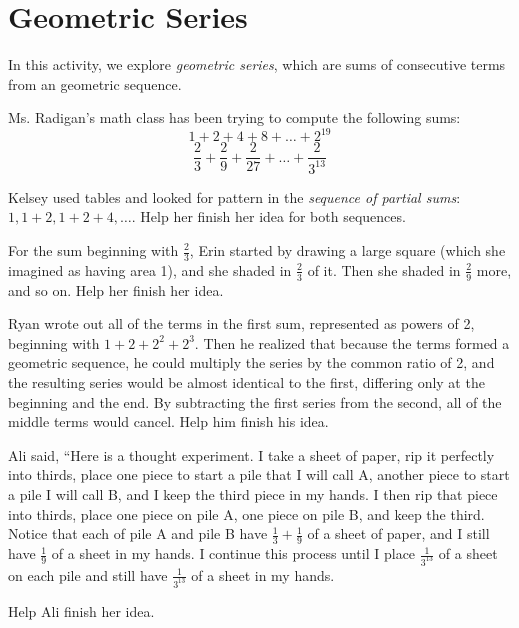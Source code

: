 \newpage
\section{Geometric Series}\label{A:geometicSeries}

In this activity, we explore \emph{geometric series}, which are sums of consecutive terms from an geometric sequence.

Ms. Radigan's math class has been trying to compute the following sums:  
$$1+2+4+8+\dots+2^{19}$$
$$\frac{2}{3}+\frac{2}{9}+\frac{2}{27}+\dots+\frac{2}{3^{13}}$$

\begin{prob}
Kelsey used tables and looked for pattern in the \emph{sequence of partial sums}:  $1, 1+2, 1+2+4, \dots$.  Help her finish her idea for both sequences.    
\end{prob}

\begin{prob}
For the sum beginning with $\frac{2}{3}$, Erin started by drawing a large square (which she imagined as having area 1), and she shaded in $\frac{2}{3}$ of it.  Then she shaded in $\frac{2}{9}$ more, and so on.  Help her finish her idea.  
\end{prob}

\begin{prob}
Ryan wrote out all of the terms in the first sum, represented as powers of 2, beginning with $1+2+2^2+2^3$.  
Then he realized that because the terms formed a geometric sequence, he could multiply the series by the common ratio of 2, and the resulting series would be almost identical to the first, differing only at the beginning and the end.  By subtracting the first series from the second, all of the middle terms would cancel.  Help him finish his idea.  
\end{prob}

\begin{prob}
Ali said, ``Here is a thought experiment.  I take a sheet of paper, rip it perfectly into thirds, place one piece to start a pile that I will call A, another piece to start a pile I will call B, and I keep the third piece in my hands.  I then rip that piece into thirds, place one piece on pile A, one piece on pile B, and keep the third.  Notice that each of pile A and pile B have $\frac{1}{3}+\frac{1}{9}$ of a sheet of paper, and I still have $\frac{1}{9}$ of a sheet in my hands.  I continue this process until I place $\frac{1}{3^{13}}$ of a sheet on each pile and still have $\frac{1}{3^{13}}$ of a sheet in my hands.  

Help Ali finish her idea.  
\end{prob}


